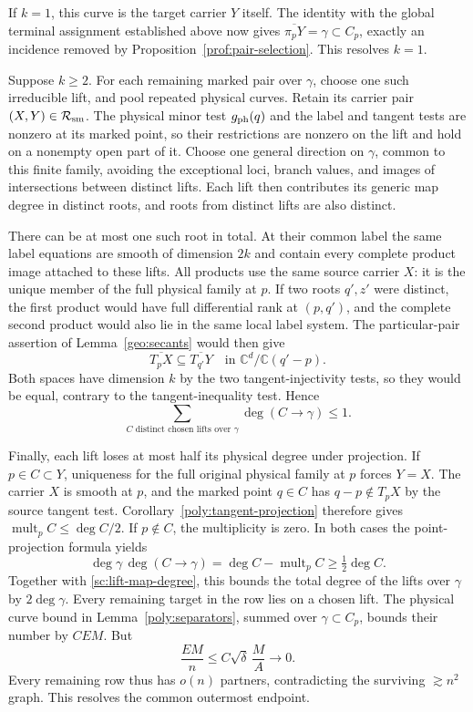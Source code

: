 If $k=1$, this curve is the target carrier $Y$ itself.  The identity
with the global terminal assignment established above now gives
$\overline{\pi_pY}=\gamma\subset C_p$, exactly an incidence removed by
Proposition~\ref{prof:pair-selection}.  This resolves $k=1$.

Suppose $k\ge2$.  For each remaining marked pair over $\gamma$, choose
one such irreducible lift, and pool repeated physical curves.  Retain its
carrier pair $(X,Y)\in\mathcal R_{\rm sm}$.  The physical minor test
$g_{\rm ph}(q)$ and the label and tangent tests are nonzero at its marked
point, so their restrictions are nonzero on the lift and hold on a
nonempty open part of it.  Choose one general direction on $\gamma$, common to this finite
family, avoiding the exceptional loci, branch values, and images of
intersections between distinct lifts.  Each lift then contributes its
generic map degree in distinct roots, and roots from distinct lifts are
also distinct.

There can be at most one such root in total.  At their common label the
same label equations are smooth of dimension $2k$ and contain every
complete product image attached to these lifts.  All products use the
same source carrier $X$: it is the unique member of the full physical
family at $p$.  If two roots $q',z'$ were distinct, the first product
would have full differential rank at $(p,q')$, and the complete second
product would also lie in the same local label system.  The
particular-pair assertion of Lemma~\ref{geo:secants} would then give
\[
 \overline{T_pX}\subseteq\overline{T_{q'}Y}
 \quad\text{in }\mathbb C^d/\mathbb C(q'-p).
\]
Both spaces have dimension $k$ by the two tangent-injectivity tests, so
they would be equal, contrary to the tangent-inequality test.  Hence
\begin{equation}\label{sc:lift-map-degree}
 \sum_{C\text{ distinct chosen lifts over }\gamma}
       \deg(C\longrightarrow\gamma)\le1.
\end{equation}

Finally, each lift loses at most half its physical degree under projection.
If $p\in C\subset Y$, uniqueness for the full original physical family
at $p$ forces $Y=X$.  The carrier $X$ is smooth at $p$, and the marked
point $q\in C$ has $q-p\notin T_pX$ by the source tangent test.
Corollary~\ref{poly:tangent-projection} therefore gives
$\operatorname{mult}_pC\le\deg C/2$.  If $p\notin C$, the multiplicity
is zero.  In both cases the point-projection formula yields
\[
 \deg\gamma\,\deg(C\to\gamma)
 =\deg C-\operatorname{mult}_pC\ge\tfrac12\deg C.
\]
Together with \eqref{sc:lift-map-degree}, this bounds the total degree of
the lifts over $\gamma$ by $2\deg\gamma$.  Every remaining target in the
row lies on a chosen lift.  The physical curve bound in
Lemma~\ref{poly:separators}, summed over $\gamma\subset C_p$, bounds their
number by $CEM$.  But
\[
 \frac{EM}{n}\le C\sqrt\delta\,\frac MA\longrightarrow0.
\]
Every remaining row thus has $o(n)$ partners, contradicting the surviving
$\gtrsim n^2$ graph.  This resolves the common outermost endpoint.

